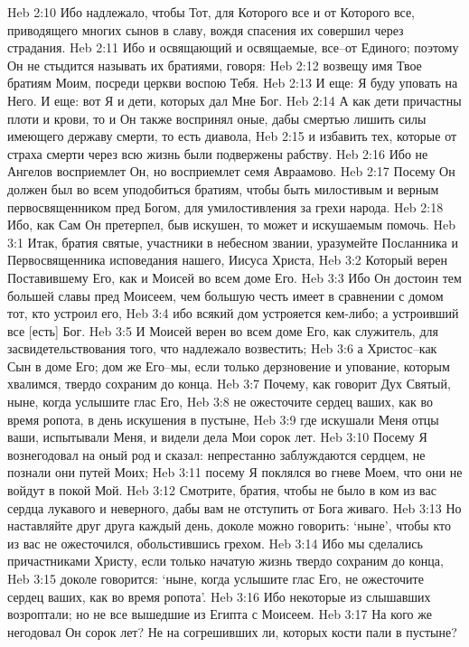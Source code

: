 Heb 2:10  Ибо надлежало, чтобы Тот, для Которого все и от Которого все, приводящего многих сынов в славу, вождя спасения их совершил через страдания.
Heb 2:11  Ибо и освящающий и освящаемые, все--от Единого; поэтому Он не стыдится называть их братиями, говоря:
Heb 2:12  возвещу имя Твое братиям Моим, посреди церкви воспою Тебя.
Heb 2:13  И еще: Я буду уповать на Него. И еще: вот Я и дети, которых дал Мне Бог.
Heb 2:14  А как дети причастны плоти и крови, то и Он также воспринял оные, дабы смертью лишить силы имеющего державу смерти, то есть диавола,
Heb 2:15  и избавить тех, которые от страха смерти через всю жизнь были подвержены рабству.
Heb 2:16  Ибо не Ангелов восприемлет Он, но восприемлет семя Авраамово.
Heb 2:17  Посему Он должен был во всем уподобиться братиям, чтобы быть милостивым и верным первосвященником пред Богом, для умилостивления за грехи народа.
Heb 2:18  Ибо, как Сам Он претерпел, быв искушен, то может и искушаемым помочь.
Heb 3:1  Итак, братия святые, участники в небесном звании, уразумейте Посланника и Первосвященника исповедания нашего, Иисуса Христа,
Heb 3:2  Который верен Поставившему Его, как и Моисей во всем доме Его.
Heb 3:3  Ибо Он достоин тем большей славы пред Моисеем, чем большую честь имеет в сравнении с домом тот, кто устроил его,
Heb 3:4  ибо всякий дом устрояется кем-либо; а устроивший все [есть] Бог.
Heb 3:5  И Моисей верен во всем доме Его, как служитель, для засвидетельствования того, что надлежало возвестить;
Heb 3:6  а Христос--как Сын в доме Его; дом же Его--мы, если только дерзновение и упование, которым хвалимся, твердо сохраним до конца.
Heb 3:7  Почему, как говорит Дух Святый, ныне, когда услышите глас Его,
Heb 3:8  не ожесточите сердец ваших, как во время ропота, в день искушения в пустыне,
Heb 3:9  где искушали Меня отцы ваши, испытывали Меня, и видели дела Мои сорок лет.
Heb 3:10  Посему Я вознегодовал на оный род и сказал: непрестанно заблуждаются сердцем, не познали они путей Моих;
Heb 3:11  посему Я поклялся во гневе Моем, что они не войдут в покой Мой.
Heb 3:12  Смотрите, братия, чтобы не было в ком из вас сердца лукавого и неверного, дабы вам не отступить от Бога живаго.
Heb 3:13  Но наставляйте друг друга каждый день, доколе можно говорить: `ныне', чтобы кто из вас не ожесточился, обольстившись грехом.
Heb 3:14  Ибо мы сделались причастниками Христу, если только начатую жизнь твердо сохраним до конца,
Heb 3:15  доколе говорится: `ныне, когда услышите глас Его, не ожесточите сердец ваших, как во время ропота'.
Heb 3:16  Ибо некоторые из слышавших возроптали; но не все вышедшие из Египта с Моисеем.
Heb 3:17  На кого же негодовал Он сорок лет? Не на согрешивших ли, которых кости пали в пустыне?
